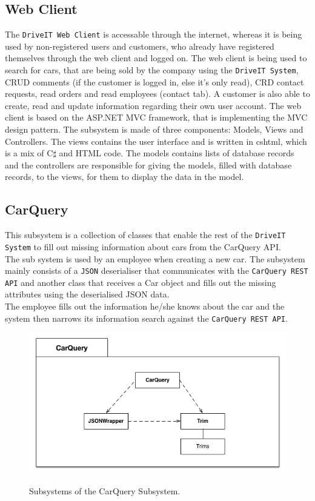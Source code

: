\subsection{Web Client}
The \texttt{DriveIT Web Client} is accessable through the internet, whereas it is being used by non-registered users and customers, who already have registered themselves through the web client and logged on. The web client is being used to search for cars, that are being sold by the company using the \texttt{DriveIT System}, CRUD comments (if the customer is logged in, else it's only read), CRD contact requests, read orders and read employees (contact tab). A customer is also able to create, read and update information regarding their own user account.
The web client is based on the ASP.NET MVC framework, that is implementing the MVC design pattern. The subsystem is made of three components: Models, Views and Controllers. The views contains the user interface and is written in cshtml, which is a mix of C$\sharp$ and HTML code. The models contains lists of database records and the controllers are responsible for giving the models, filled with database records, to the views, for them to display the data in the model.

\subsection{CarQuery} 
This subsystem is a collection of classes that enable the rest of the \texttt{DriveIT System} to fill out missing information about cars from the CarQuery API.\\
The sub system is used by an employee when creating a new car. The subsystem mainly consists of a \texttt{JSON} deserialiser that communicates with the \texttt{CarQuery REST API} and another class that receives a Car object and fills out the missing attributes using the deserialised JSON data. \\
The employee fills out the information he/she knows about the car and the system then narrows its information search against the \texttt{CarQuery REST API}.
\begin{figure}[H]
	\centering
	\includegraphics[scale=0.60]{Figures/CarQuerySubsystemDecomposition}\\
	\caption{Subsystems of the CarQuery Subsystem.}
\end{figure}